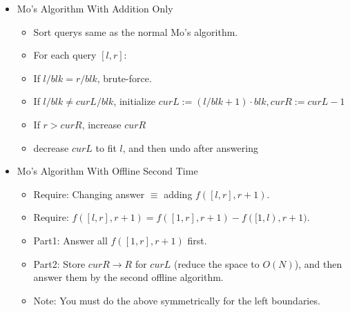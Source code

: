 \begin{itemize}\itemsep-0.3em
\item Mo's Algorithm With Addition Only
\begin{itemize}\itemsep-0.3em
    \item Sort querys same as the normal Mo's algorithm.
    \item For each query $[l, r]$:
    \item If $l / blk = r / blk$, brute-force.
    \item If $l / blk \neq curL / blk$, initialize $curL := (l / blk + 1) \cdot blk, curR := curL - 1$
    \item If $r > curR$, increase $curR$
    \item decrease $curL$ to fit $l$, and then undo after answering
\end{itemize}
\item Mo's Algorithm With Offline Second Time
\begin{itemize}\itemsep-0.3em
    \item Require: Changing answer $\equiv$ adding $f([l, r], r + 1)$.
    \item Require: $f([l, r], r + 1) = f([1, r], r + 1) - f([1, l), r + 1)$.
    \item Part1: Answer all $f([1, r], r + 1)$ first.
    \item Part2: Store $curR \to R$ for $curL$ (reduce the space to $O(N)$), and then answer them by the second offline algorithm.
    \item Note: You must do the above symmetrically for the left boundaries.
\end{itemize}
\end{itemize}
